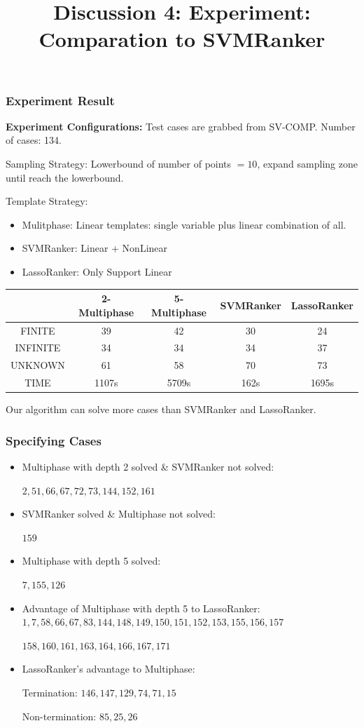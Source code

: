 \documentclass[10pt]{beamer}
\title{Discussion 4: Experiment: Comparation to SVMRanker}
\begin{document}
\maketitle
\begin{frame}\frametitle{Experiment Result}
\textbf{Experiment Configurations:}
Test cases are grabbed from SV-COMP. Number of cases: 134.

Sampling Strategy: Lowerbound of number of points $=10$, expand sampling zone until reach the lowerbound.

Template Strategy: 
\begin{itemize}
\item Mulitphase: Linear templates: single variable plus linear combination of all.
\item SVMRanker: Linear + NonLinear
\item LassoRanker: Only Support Linear
\end{itemize}
\begin{center}
\begin{tabular}{|c|c|c|c|c|}
\hline
& 2-Multiphase& 5-Multiphase & SVMRanker & LassoRanker\\
\hline 
FINITE & 39 & 42&30 & 24\\
\hline 

INFINITE & 34& 34&34 & 37\\
\hline

UNKNOWN & 61& 58&70 & 73\\
\hline
TIME &1107s& 5709s& 162s& 1695s\\
\hline

\end{tabular}
\end{center}


Our algorithm can solve more cases than SVMRanker and LassoRanker.
\end{frame}


\begin{frame}\frametitle{Specifying Cases}
\begin{itemize}
\item Multiphase with depth 2 solved \& SVMRanker not solved:

$2,51,66,67,72,73,144,152,161$
\item SVMRanker solved \& Multiphase not solved:

$159$
\item Multiphase with depth 5 solved:

$7,155,126$
\item Advantage of Multiphase with depth 5 to LassoRanker:
$1,7,58,66,67,83,144,148,149,150,151,152,153,155,156,157$

$158,160,161,163,164,166,167,171$

\item LassoRanker's advantage to Multiphase:

Termination: $146,147,129,74,71,15$

Non-termination: $85,25,26$
\end{itemize}

\end{frame}
\end{document}
